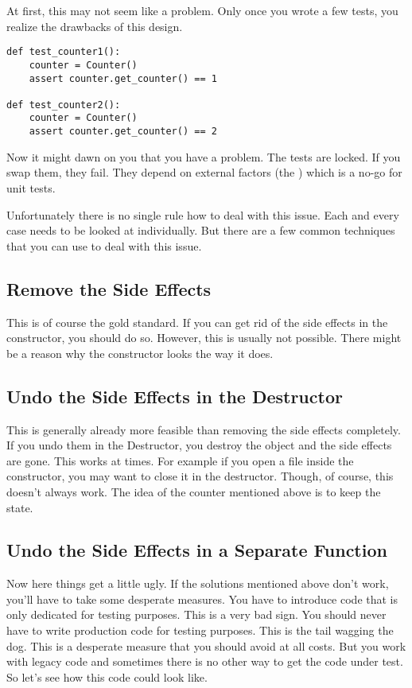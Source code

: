 At first, this may not seem like a problem. Only once you wrote a few tests, you realize the drawbacks of this design.

\begin{programcode}{}
\begin{verbatim}
def test_counter1():
    counter = Counter()
    assert counter.get_counter() == 1

def test_counter2():
    counter = Counter()
    assert counter.get_counter() == 2
\end{verbatim}
\end{programcode}

Now it might dawn on you that you have a problem. The tests are locked. If you swap them, they fail. They depend on external factors (the ) which is a no-go for unit tests.

Unfortunately there is no single rule how to deal with this issue. Each and every case needs to be looked at individually. But there are a few common techniques that you can use to deal with this issue.

\subsection{Remove the Side Effects}

This is of course the gold standard. If you can get rid of the side effects in the constructor, you should do so. However, this is usually not possible. There might be a reason why the constructor looks the way it does.

\subsection{Undo the Side Effects in the Destructor}

This is generally already more feasible than removing the side effects completely. If you undo them in the Destructor, you destroy the object and the side effects are gone. This works at times. For example if you open a file inside the constructor, you may want to close it in the destructor. Though, of course, this doesn't always work. The idea of the counter mentioned above is to keep the state.

\subsection{Undo the Side Effects in a Separate Function}

Now here things get a little ugly. If the solutions mentioned above don't work, you'll have to take some desperate measures. You have to introduce code that is only dedicated for testing purposes. This is a very bad sign. You should never have to write production code for testing purposes. This is the tail wagging the dog. This is a desperate measure that you should avoid at all costs. But you work with legacy code and sometimes there is no other way to get the code under test. So let's see how this code could look like.

